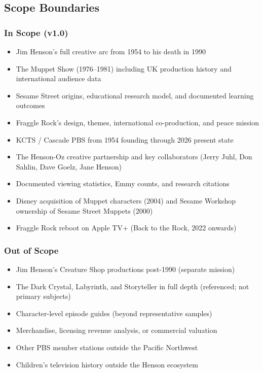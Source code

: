 \documentclass[11pt,letterpaper]{article}
\begin{document}
\subsection{Scope Boundaries}

\subsubsection{In Scope (v1.0)}
\begin{itemize}[leftmargin=*]
  \item Jim Henson's full creative arc from 1954 to his death in 1990
  \item The Muppet Show (1976--1981) including UK production history and international audience data
  \item Sesame Street origins, educational research model, and documented learning outcomes
  \item Fraggle Rock's design, themes, international co-production, and peace mission
  \item KCTS / Cascade PBS from 1954 founding through 2026 present state
  \item The Henson-Oz creative partnership and key collaborators (Jerry Juhl, Don Sahlin, Dave Goelz, Jane Henson)
  \item Documented viewing statistics, Emmy counts, and research citations
  \item Disney acquisition of Muppet characters (2004) and Sesame Workshop ownership of Sesame Street Muppets (2000)
  \item Fraggle Rock reboot on Apple TV+ (Back to the Rock, 2022 onwards)
\end{itemize}

\subsubsection{Out of Scope}
\begin{itemize}[leftmargin=*]
  \item Jim Henson's Creature Shop productions post-1990 (separate mission)
  \item The Dark Crystal, Labyrinth, and Storyteller in full depth (referenced; not primary subjects)
  \item Character-level episode guides (beyond representative samples)
  \item Merchandise, licensing revenue analysis, or commercial valuation
  \item Other PBS member stations outside the Pacific Northwest
  \item Children's television history outside the Henson ecosystem
\end{itemize}
\end{document}
